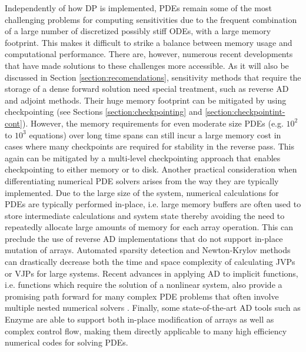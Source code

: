 Independently of how DP is implemented, PDEs remain some of the most challenging problems for computing sensitivities due to the frequent combination of a large number of discretized possibly stiff ODEs, with a large memory footprint. 
This makes it difficult to strike a balance between memory usage and computational performance. 
There are, however, numerous recent developments that have made solutions to these challenges more accessible. 
As it will also be discussed in Section \ref{section:recomendations}, sensitivity methods that require the storage of a dense forward solution need special treatment, such as reverse AD and adjoint methods. 
Their huge memory footprint can be mitigated by using checkpointing (see Sections \ref{section:checkpointing} and \ref{section:checkpointint-cont}).
However, the memory requirements for even moderate size PDEs (e.g. $10^2$ to $10^3$ equations) over long time spans can still incur a large memory cost in cases where many checkpoints are required for stability in the reverse pass. 
This again can be mitigated by a multi-level checkpointing approach that enables checkpointing to either memory or to disk.
Another practical consideration when differentiating numerical PDE solvers arises from the way they are typically implemented. 
Due to the large size of the system, numerical calculations for PDEs are typically performed in-place, i.e. large memory buffers are often used to store intermediate calculations and system state thereby avoiding the need to repeatedly allocate large amounts of memory for each array operation. 
This can preclude the use of reverse AD implementations that do not support in-place mutation of arrays.
Automated sparsity detection \cite{gowdaSparsityProgrammingAutomated2019} and Newton-Krylov methods \cite{knollJacobianfreeNewtonKrylov2004,montoisonKrylovJlJulia2023} can drastically decrease both the time and space complexity of calculating JVPs or VJPs for large systems. 
Recent advances in applying AD to implicit functions, i.e. functions which require the solution of a nonlinear system, also provide a promising path forward for many complex PDE problems that often involve multiple nested numerical solvers \cite{blondelEfficientModularImplicit2022a}. 
Finally, some state-of-the-art AD tools such as Enzyme \cite{moses_Enzyme} are able to support both in-place modification of arrays as well as complex control flow, making them directly applicable to many high efficiency numerical codes for solving PDEs.



